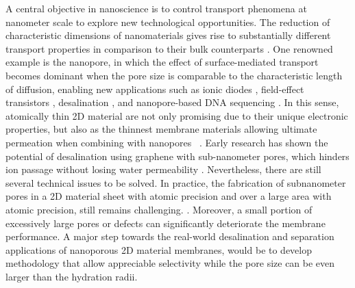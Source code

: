 %
A central objective in nano\-science is to control transport phenomena
at nanometer scale to explore new technological opportunities.  The
reduction of characteristic dimensions of nano\-materials gives rise
to substantially different transport properties in comparison to their
bulk counterparts \autocite{Schoch_2008_nanofluid}.
%
One renowned example is the nanopore, in which the effect of
surface-mediated transport becomes dominant when the pore size is
comparable to the characteristic length of diffusion, enabling new
applications such as ionic diodes
\autocite{Karnik_2007_nanofluidic,Siwy_2002_fabrication_NPore,Vlassiouk_2007_nanofluidic},
field-effect transistors \autocite{Nam_2009_IFET_sub10nm}, desalination
\autocite{Heiranian_2015_desali}, and nanopore-based DNA sequencing
\autocite{Heerema_2016_gr_np_DNA,Garaj_2013_hugging_gr_pore}.
%
In this sense, atomically thin 2D material are not only promising due
to their unique electronic properties, but also as the thinnest
membrane materials allowing ultimate permeation when combining with
nanopores
~\autocite{Suk_2010_water_PG,Jiang_2009_PG_gas,Celebi_2014_science,Koenig_2012,Drahushuk_2012_gas_permeation_gr}.
%
Early research has shown the potential of desalination using graphene
with sub-nanometer pores, which hinders ion passage without losing
water permeability
\autocite{Cohen_Tanugi_2012,Suk_2014_ion_sub_5nm,Cohen_Tanugi_2014_permeab,Cohen_Tanugi_2015_PG,O_Hern_2014_ion,O_Hern_2015_ion_gr,Surwade_2015_desali_npg,Walker_2017_cation_select_2D,Ghosh_2018_PG_ion}.
Nevertheless, there are still several technical issues to be solved.
In practice, the fabrication of sub\-nanometer pores in
a 2D material sheet with atomic precision and over a large area with
atomic precision, still remains challenging.
\autocite{Suk_2014_ion_sub_5nm,Rollings_2016_gating,O_Hern_2012_defect,Wang_2017_mechanism_thin_membrane}.
%
Moreover, a small portion of excessively large pores or defects can
significantly deteriorate the membrane performance.
%
A major step towards the real-world desalination and separation
applications of nanoporous 2D material membranes, would be to develop
methodology that allow appreciable selectivity while the pore size can
be even larger than the hydration radii.

